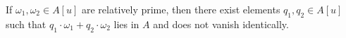 If $\omega_1, \omega_2 \in A[u]$ are relatively prime, then there exist elements $q_1, q_2 \in A[u]$ such that $q_1 \cdot \omega_1 + q_2 \cdot \omega_2$ lies in $A$ and does not vanish identically.
